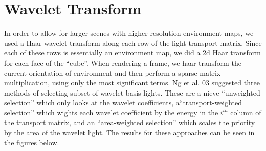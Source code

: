 \documentclass[11pt]{article}
\begin{document}
\section{Wavelet Transform}

In order to allow for larger scenes with higher resolution environment maps, we
used a Haar wavelet transform along each row of the light transport matrix.
Since each of these rows is essentially an environment map, we did a 2d Haar
transform for each face of the ``cube''. When rendering a frame, we haar
transform the current orientation of environment and then perform a sparse
matrix multiplication, using only the most significant terms. Ng et al. 03
suggested three methods of selecting subset of wavelet basis lights. These are
a nieve ``unweighted selection'' which only looks at the wavelet coefficients,
a``transport-weighted selection'' which wights each wavelet coefficient by the
energy in the $i^{th}$ column of the transport matrix, and an ``area-weighted
selection'' which scales the priority by the area of the wavelet light. The
results for these approaches can be seen in the figures below.
\end{document}

